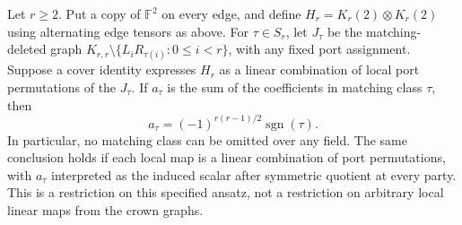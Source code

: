 \begin{proposition}
\label{pg:cauchy-class}
Let $r\geq2$. Put a copy of $\mathbb F^2$ on every edge, and define
$H_r=K_r(2)\otimes K_r(2)$ using alternating edge tensors as above. For
$\tau\in S_r$, let $J_\tau$ be the matching-deleted graph
$K_{r,r}\setminus\{L_iR_{\tau(i)}:0\leq i<r\}$, with any fixed port
assignment. Suppose a cover identity expresses $H_r$ as a linear
combination of local port permutations of the $J_\tau$. If $a_\tau$ is
the sum of the coefficients in matching class $\tau$, then
\[
 a_\tau=(-1)^{r(r-1)/2}\operatorname{sgn}(\tau).
 \tag{PG-CAUCHY-class}
\]
In particular, no matching class can be omitted over any field. The same
conclusion holds if each local map is a linear combination of port
permutations, with $a_\tau$ interpreted as the induced scalar after symmetric
quotient at every party. This is a restriction on this specified ansatz,
not a restriction on arbitrary local linear maps from the crown graphs.
\end{proposition}
